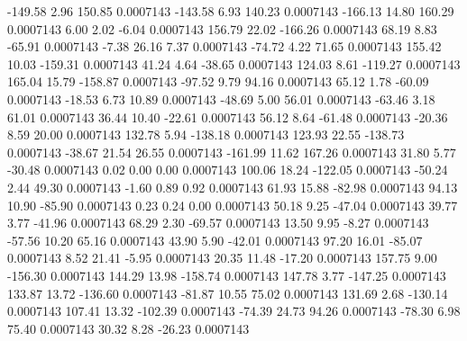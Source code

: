      -149.58        2.96      150.85     0.0007143
     -143.58        6.93      140.23     0.0007143
     -166.13       14.80      160.29     0.0007143
        6.00        2.02       -6.04     0.0007143
      156.79       22.02     -166.26     0.0007143
       68.19        8.83      -65.91     0.0007143
       -7.38       26.16        7.37     0.0007143
      -74.72        4.22       71.65     0.0007143
      155.42       10.03     -159.31     0.0007143
       41.24        4.64      -38.65     0.0007143
      124.03        8.61     -119.27     0.0007143
      165.04       15.79     -158.87     0.0007143
      -97.52        9.79       94.16     0.0007143
       65.12        1.78      -60.09     0.0007143
      -18.53        6.73       10.89     0.0007143
      -48.69        5.00       56.01     0.0007143
      -63.46        3.18       61.01     0.0007143
       36.44       10.40      -22.61     0.0007143
       56.12        8.64      -61.48     0.0007143
      -20.36        8.59       20.00     0.0007143
      132.78        5.94     -138.18     0.0007143
      123.93       22.55     -138.73     0.0007143
      -38.67       21.54       26.55     0.0007143
     -161.99       11.62      167.26     0.0007143
       31.80        5.77      -30.48     0.0007143
        0.02        0.00        0.00     0.0007143
      100.06       18.24     -122.05     0.0007143
      -50.24        2.44       49.30     0.0007143
       -1.60        0.89        0.92     0.0007143
       61.93       15.88      -82.98     0.0007143
       94.13       10.90      -85.90     0.0007143
        0.23        0.24        0.00     0.0007143
       50.18        9.25      -47.04     0.0007143
       39.77        3.77      -41.96     0.0007143
       68.29        2.30      -69.57     0.0007143
       13.50        9.95       -8.27     0.0007143
      -57.56       10.20       65.16     0.0007143
       43.90        5.90      -42.01     0.0007143
       97.20       16.01      -85.07     0.0007143
        8.52       21.41       -5.95     0.0007143
       20.35       11.48      -17.20     0.0007143
      157.75        9.00     -156.30     0.0007143
      144.29       13.98     -158.74     0.0007143
      147.78        3.77     -147.25     0.0007143
      133.87       13.72     -136.60     0.0007143
      -81.87       10.55       75.02     0.0007143
      131.69        2.68     -130.14     0.0007143
      107.41       13.32     -102.39     0.0007143
      -74.39       24.73       94.26     0.0007143
      -78.30        6.98       75.40     0.0007143
       30.32        8.28      -26.23     0.0007143
